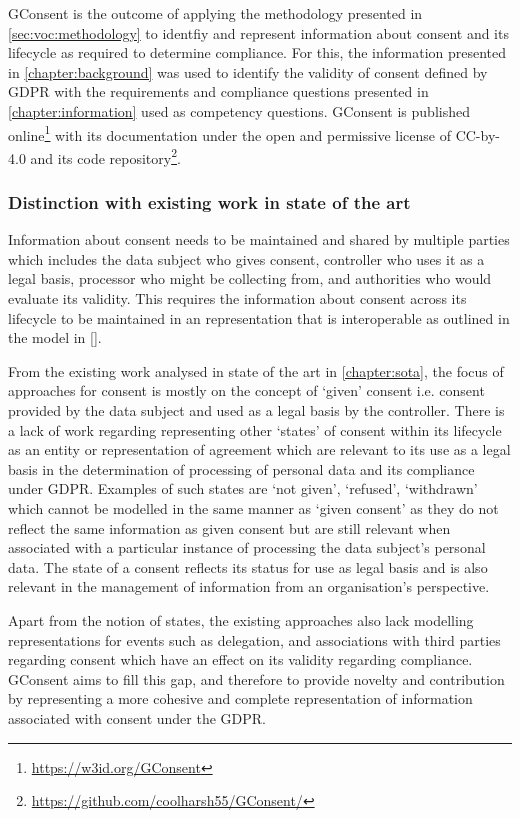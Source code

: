 GConsent is the outcome of applying the methodology presented in \autoref{sec:voc:methodology} to identfiy and represent information about consent and its lifecycle as required to determine compliance.
For this, the information presented in \autoref{chapter:background} was used to identify the validity of consent defined by GDPR with the requirements and compliance questions presented in \autoref{chapter:information} used as competency questions.
GConsent is published online\footnote{\url{https://w3id.org/GConsent}} with its documentation under the open and permissive license of CC-by-4.0 and its code repository\footnote{\url{https://github.com/coolharsh55/GConsent/}}.

\subsubsection{Distinction with existing work in state of the art}
Information about consent needs to be maintained and shared by multiple parties which includes the data subject who gives consent, controller who uses it as a legal basis, processor who might be collecting from, and authorities who would evaluate its validity. This requires the information about consent across its lifecycle to be maintained in an representation that is interoperable as outlined in the model in \autoref{}.

From the existing work analysed in state of the art in \autoref{chapter:sota}, the focus of approaches for consent is mostly on the concept of `given' consent i.e. consent provided by the data subject and used as a legal basis by the controller. There is a lack of work regarding representing other `states' of consent within its lifecycle as an entity or representation of agreement which are relevant to its use as a legal basis in the determination of processing of personal data and its compliance under GDPR.
Examples of such states are `not given', `refused', `withdrawn' which cannot be modelled in the same manner as `given consent' as they do not reflect the same information as given consent but are still relevant when associated with a particular instance of processing the data subject's personal data. The state of a consent reflects its status for use as legal basis and is also relevant in the management of information from an organisation's perspective.

Apart from the notion of states, the existing approaches also lack modelling representations for events such as delegation, and associations with third parties regarding consent which have an effect on its validity regarding compliance.
GConsent aims to fill this gap, and therefore to provide novelty and contribution by representing a more cohesive and complete representation of information associated with consent under the GDPR.

